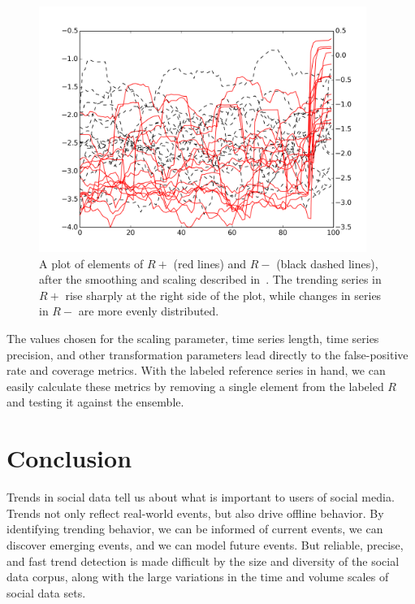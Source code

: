 \documentclass{article}
\begin{document}
\begin{figure}
\begin{center}
\includegraphics[width=0.95\textwidth]{fig/nikolov2.png} 
\caption{A plot of elements of $R+$ (red lines) and $R-$ (black dashed lines), 
after the smoothing and scaling described in~\cite{Nikolov:2011}.  
The trending series in $R+$ rise sharply at the right side of the plot, 
while changes in series in $R-$ are more evenly distributed.}
\label{fig:reference_series}
\end{center}
\end{figure}

The values chosen for the scaling parameter, time series length, time series
precision, and other transformation parameters lead directly to the
false-positive rate and coverage metrics. With the labeled reference series
in hand, we can easily calculate these metrics by removing a single
element from the labeled $R$ and testing it against the ensemble. 


\section{Conclusion} 

Trends in social data tell us about what is important to users of social media.
Trends not only reflect real-world events, but also drive offline behavior. By
identifying trending behavior, we can be informed of current events, we can
discover emerging events, and we can model future events. But reliable,
precise, and fast trend detection is made difficult by the size and diversity
of the social data corpus, along with the large variations in the time and
volume scales of social data sets. 
\end{document}
